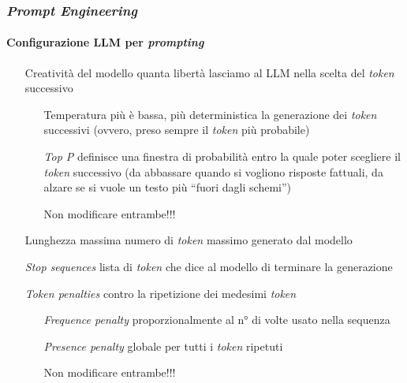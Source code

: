 \begin{frame}[t] \frametitle{\emph{Prompt Engineering}}
\framesubtitle{Configurazione LLM per \emph{prompting}}
{\footnotesize
    \begin{minipage}[t]{\textwidth}
        \begin{itemize}[leftmargin=80pt,align=right]
            \item[\alert{Creatività del modello}] quanta libertà lasciamo al LLM nella scelta del \emph{token} successivo
            \begin{itemize}[leftmargin=50pt,align=right]
            \item[\alert{Temperatura}] più è bassa, più deterministica la generazione dei \emph{token} successivi (ovvero, preso sempre il \emph{token} più probabile)
            \item[\alert{\emph{Top P}}] definisce una finestra di probabilità entro la quale poter scegliere il \emph{token} successivo (da abbassare quando si vogliono risposte fattuali, da alzare se si vuole un testo più ``fuori dagli schemi'')
            \item[\alert{\faExclamationTriangle}] Non modificare entrambe!!!
            \end{itemize}
            \item[\alert{Lunghezza massima}] numero di \emph{token} massimo generato dal modello
            \item[\alert{\emph{Stop sequences}}] lista di \emph{token} che dice al modello di terminare la generazione
            \item[\alert{\emph{Token penalties}}] contro la ripetizione dei medesimi \emph{token}
            \begin{itemize}[leftmargin=63pt,align=right]
                \item[\alert{\emph{Frequence penalty}}] proporzionalmente al n° di volte usato nella sequenza
                \item[\alert{\emph{Presence penalty}}] globale per tutti i \emph{token} ripetuti
                \item[\alert{\faExclamationTriangle}] Non modificare entrambe!!!
            \end{itemize}
        \end{itemize}
    \end{minipage}
}
\end{frame}
%
